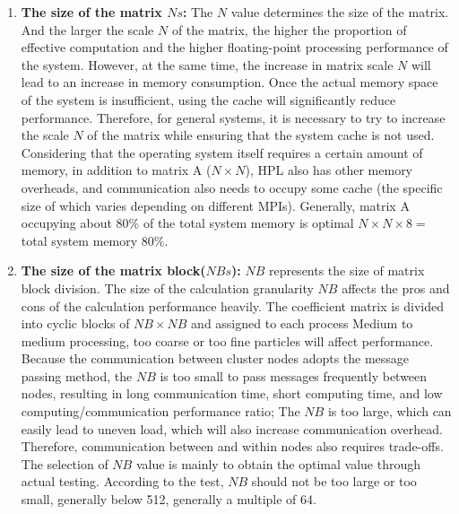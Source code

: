 \begin{enumerate}
    \item \textbf{The size of the matrix $Ns$:} The $N$ value determines the size of the matrix. 
    And the larger the scale $N$ of the matrix, the higher the proportion of effective computation and the higher floating-point processing performance of the system.
    However, at the same time, the increase in matrix scale $N$ will lead to an increase in memory consumption. 
    Once the actual memory space of the system is insufficient, using the cache will significantly reduce performance. 
    Therefore, for general systems, it is necessary to try to increase the scale $N$ of the matrix while ensuring that the system cache is not used. 
    Considering that the operating system itself requires a certain amount of memory, in addition to matrix A ($N \times N$), HPL also has other memory overheads, and communication also needs to occupy some cache (the specific size of which varies depending on different MPIs). 
    Generally, matrix A occupying about $80\%$ of the total system memory is optimal $N\times N\times8{=}$total system memory $80\%$.
    \item \textbf{The size of the matrix block($NBs$):} $NB$ represents the size of matrix block division. 
    The size of the calculation granularity $NB$ affects the pros and cons of the calculation performance heavily. 
    The coefficient matrix is divided into cyclic blocks of $NB \times NB$ and assigned to each process Medium to medium processing, too coarse or too fine particles will affect performance. 
    Because the communication between cluster nodes adopts the message passing method, the $NB$ is too small to pass messages frequently between nodes, resulting in long communication time, short computing time, and low computing/communication performance ratio; The $NB$ is too large, which can easily lead to uneven load, which will also increase communication overhead. 
    Therefore, communication between and within nodes also requires trade-offs. 
    The selection of $NB$ value is mainly to obtain the optimal value through actual testing. 
    According to the test, $NB$ should not be too large or too small, generally below 512, generally a multiple of 64. 
    

\end{enumerate}
